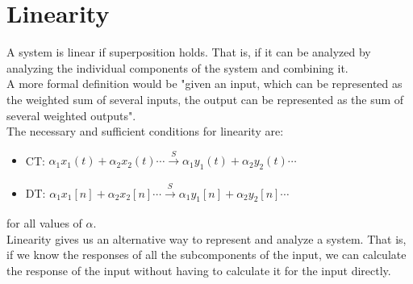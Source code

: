 \documentclass[nobib]{tufte-handout}
\begin{document}
\section{Linearity}
A system is linear if superposition holds. That is, if it can be analyzed by
analyzing the individual components of the system and combining it.\\ A more
formal definition would be "given an input, which can be represented as the
weighted sum of several inputs, the output can be represented as the sum of
several weighted outputs".\\ The necessary and sufficient conditions for
linearity are:
\begin{itemize}
    \item CT: $\alpha_1 x_1(t)+\alpha_2 x_2(t)\cdots\xrightarrow[]{S} \alpha_1
              y_1(t)+\alpha_2 y_2(t)\cdots$
    \item DT: $\alpha_1 x_1[n]+\alpha_2 x_2[n]\cdots\xrightarrow[]{S} \alpha_1
              y_1[n]+\alpha_2 y_2[n]\cdots$
\end{itemize}
for all values of $\alpha$.\\

Linearity gives us an alternative way to represent and analyze a system. That
is, if we know the responses of all the subcomponents of the input, we can
calculate the response of the input without having to calculate it for the
input directly.
\end{document}
